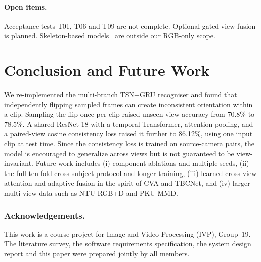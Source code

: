 \documentclass[runningheads]{llncs}
\begin{document}
\paragraph{Open items.} Acceptance tests T01, T06 and T09 are not complete. Optional gated view fusion is planned. Skeleton-based models~\cite{zhou2024,do2024} are outside our RGB-only scope.

\section{Conclusion and Future Work}
We re-implemented the multi-branch TSN+GRU recogniser and found that independently flipping sampled frames can create inconsistent orientation within a clip. Sampling the flip once per clip raised unseen-view accuracy from 70.8\% to 78.5\%. A shared ResNet-18 with a temporal Transformer, attention pooling, and a paired-view cosine consistency loss raised it further to 86.12\%, using one input clip at test time. Since the consistency loss is trained on source-camera pairs, the model is encouraged to generalize across views but is not guaranteed to be view-invariant.
Future work includes (i) component ablations and multiple seeds, (ii) the full ten-fold cross-subject protocol and longer training, (iii) learned cross-view attention and adaptive fusion in the spirit of CVA and TBCNet, and (iv) larger multi-view data such as NTU RGB+D and PKU-MMD.

\subsubsection*{Acknowledgements.} This work is a course project for Image and Video Processing (IVP), Group~19. The literature survey, the software requirements specification, the system design report and this paper were prepared jointly by all members.
\end{document}
